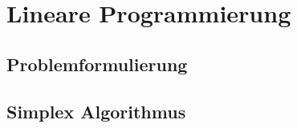 \section{Lineare Programmierung }

\subsection{Problemformulierung}
\subsection{Simplex Algorithmus}

